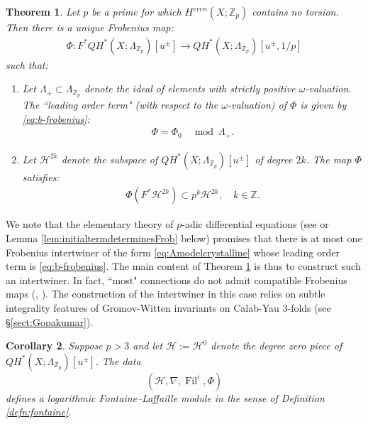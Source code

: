 \documentclass[reqno]{amsart}
\numberwithin{equation}{section}
\numberwithin{equation}{section}
\numberwithin{equation}{section}
\newtheorem{thm}{Theorem}[section]
\newtheorem{cor}[thm]{Corollary}
\theoremstyle{definition}
\theoremstyle{remark}
\theoremstyle{remark}
\begin{document}
\begin{thm}\label{thm:integrality} Let $p$ be a prime for which $H^{even}(X;\mathbb{Z}_p)$ contains no torsion. Then there is a unique Frobenius map: \begin{align}\label{eq:Amodelcrystalline} \Phi: F^*QH^*(X; \Lambda_{\mathbb{Z}_p})[u^{\pm}] \to QH^*(X; \Lambda_{\mathbb{Z}_p})[u^{\pm},1/p] \end{align} such that: \begin{enumerate} \item Let $\Lambda_{+} \subset \Lambda_{\mathbb{Z}_{p}}$ denote the ideal of elements with strictly positive $\omega$-valuation. The ``leading order term" (with respect to the $\omega$-valuation) of $\Phi$ is given by \eqref{eq:b-frobenius}: \begin{align} \Phi = \Phi_0  \quad \operatorname{mod}\ \Lambda_{+}.\end{align}  \item Let $\mathcal{H}^{2k}$ denote the subspace of $QH^*(X; \Lambda_{\mathbb{Z}_p})[u^{\pm}]$ of degree $2k$. The map $\Phi$ satisfies:   \begin{align} \label{eq:keyintegralitycondition} \Phi(F^*\mathcal{H}^{2k}) \subset p^k\mathcal{H}^{2k},\quad k \in \mathbb{Z}.\end{align} \end{enumerate} \end{thm}

 We note that the elementary theory of $p$-adic differential equations (see \cite[\S 3]{bai2025p} or Lemma \ref{lem:initialtermdeterminesFrob} below) promises that there is at most one Frobenius intertwiner of the form \eqref{eq:Amodelcrystalline} whose leading order term is \eqref{eq:b-frobenius}. The main content of Theorem \ref{thm:integrality} is thus to construct such an intertwiner. In fact, ``most" connections do not admit compatible Frobenius maps (\cite[Remark 3.2]{Katz73}, \cite[Remark 2.3.11]{Kedlaya}). The construction of the intertwiner in this case relies on subtle integrality features of Gromov-Witten invariants on Calab-Yau 3-folds (see \S \ref{sect:Gopakumar}). 

 \begin{cor} \label{cor:FLclassical} Suppose $p>3$ and let $\mathcal{H}:=\mathcal{H}^0$ denote the degree zero piece of  $QH^*(X;\Lambda_{\mathbb{Z}_p})[u^{\pm}].$ The data $$(\mathcal{H},\nabla,\operatorname{Fil}^i,\Phi)$$ defines a logarithmic Fontaine--Laffaille module in the sense of Definition \ref{defn:fontaine}.\end{cor}
\end{document}
